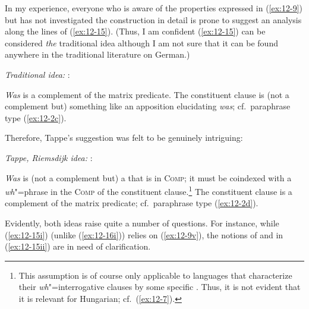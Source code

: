 \documentclass[output=paper]{langsci/langscibook}
\begin{document}
In my experience, everyone who is aware of the properties expressed in (\ref{ex:12-9}) but
has not investigated the construction in detail is prone to suggest an
analysis along the lines of (\ref{ex:12-15}). (Thus, I am confident (\ref{ex:12-15}) can be considered
\textit{the} traditional idea although I am not sure that it can be found
anywhere in the traditional literature on German.)
\begin{exe}
\ex
\label{ex:12-15}
\textit{Traditional idea: }: 
 \begin{xlisti}
\ex
\label{ex:12-15i}
\textit{Was} is a complement of the matrix predicate. 
\ex
\label{ex:12-15ii}
The constituent clause is (not a complement but) something like an
apposition elucidating \textit{was}; cf.\ paraphrase type (\ref{ex:12-2c}).
\end{xlisti}
\end{exe}
Therefore, Tappe's suggestion \citep{Tappe1980} was felt to be genuinely intriguing:
\begin{exe}
\ex
\label{ex:12-16}
\textit{Tappe, Riemsdijk idea: }: 
\begin{xlisti}
\ex
\label{ex:12-16i}
\textit{Was} is (not a complement but) a  that is
 in \textsc{Comp}; it must be coindexed with a \emph{wh}"=phrase
in the \textsc{Comp} of the constituent clause.\footnote{%
  This assumption is of course only applicable to languages that characterize their
  \textit{wh}"=interrogative clauses by some specific . Thus, 
  it is not evident that it is relevant for Hungarian; cf.\ (\ref{ex:12-7}).%
}
\ex
\label{ex:12-16ii}
The constituent clause is a complement of the matrix
predicate; cf.\ paraphrase type (\ref{ex:12-2d}).
\end{xlisti}
\end{exe}
Evidently, both ideas raise quite a number of questions. For instance, while
(\ref{ex:12-15i}) (unlike (\ref{ex:12-16i})) relies on (\ref{ex:12-9v}), the notions of  and
 in (\ref{ex:12-15ii}) are in need of clarification.
\end{document}

